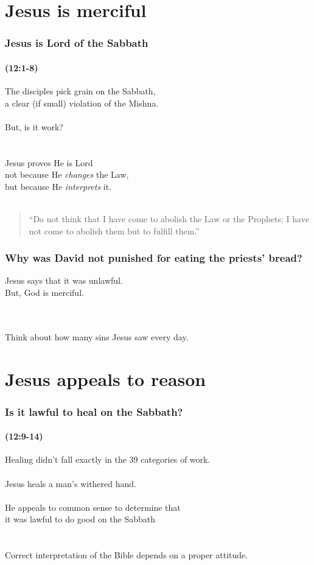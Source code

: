 \section{Jesus is merciful}

\begin{frame}
\frametitle{Jesus is Lord of the Sabbath}
\framesubtitle{(12:1-8)}
The disciples pick grain on the Sabbath,\\a clear (if small) violation of the Mishna.\\~\\
But, is it work?\\~\\~\\
Jesus proves He is Lord\\not because He \emph{changes} the Law,\\but because He \emph{interprets} it.\\~\\
\centering
\begin{quote}
``Do not think that I have come to abolish the Law or the Prophets; I have not come to abolish them but to fulfill them.''

\end{quote}
\end{frame}

\begin{frame}
\frametitle{Why was David not punished for eating the priests' bread?}
Jesus says that it was unlawful.\\
But, God is merciful.\\~\\~\\
\begin{center}
Think about how many sins Jesus saw every day.
\end{center}
\end{frame}

\section{Jesus appeals to reason}

\begin{frame}
\frametitle{Is it lawful to heal on the Sabbath?}
\framesubtitle{(12:9-14)}
Healing didn't fall exactly in the 39 categories of work.\\~\\
Jesus heals a man's withered hand.\\~\\
He appeals to common sense to determine that\\
it was lawful to do good on the Sabbath\\~\\~\\
Correct interpretation of the Bible depends on a proper attitude.\\~\\~\\
\end{frame}

